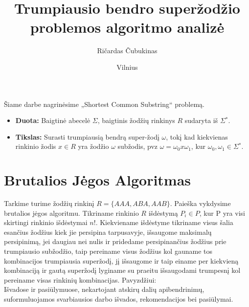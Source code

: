 \documentclass{VUMIFInfKursinis}
\institute{Informatikos institutas}
\title{Trumpiausio bendro superžodžio problemos algoritmo analizė}
\author{Ričardas Čubukinas}
\date{Vilnius \\ \the\year}
\begin{document}
\maketitle

\tableofcontents

Šiame darbe nagrinėsime „Shortest Common Substring“ problemą.
\begin{itemize}
  \item{\textbf{Duota:} Baigtinė abecelė $\Sigma$, baigtinis žodžių rinkinys $R$ sudaryta iš $\Sigma{}^*$.}
  \item{\textbf{Tikslas:} Surasti trumpiausią bendrą super-žodį $\omega$, tokį kad kiekvienas rinkinio žodis $x \in R$ yra žodžio $\omega$ subžodis, pvz $\omega =\omega{}_0x\omega{}_1$, kur $\omega{}_0,\omega{}_1 \in \Sigma{}^*$.}
\end{itemize}
\cite{ausiello1999complexity}

\section{Brutalios Jėgos Algoritmas}
Tarkime turime žodžių rinkinį $R=\{AAA, ABA, AAB\}$. Paieška vykdysime brutalios jėgos algoritmu. Tikriname rinkinio $R$ išdėstymą $P_i \in P$, kur P yra visi skirtingi rinkinio išdėstymai $n!$. Kiekviename išdėstyme tikriname visus šalia esančius žodžius kiek jie persipina tarpusavyje, išsaugome maksimalų persipinimą, jei daugiau nei nulis ir pridedame persipinančius žodžius prie trumpiausio subžodžio, taip pereiname visus žodžius kol gauname tos kombinacijos trumpiausia superžodį, jį išsaugome ir taip einame per kiekvieną kombinaciją ir gautą superžodį lyginame su praeitu išsaugodami trumpesnį kol pereiname visas rinkinių kombinacijas. Pavyzdžiui:\\

Išvadose ir pasiūlymuose, nekartojant atskirų dalių apibendrinimų,
suformuluojamos svarbiausios darbo išvados, rekomendacijos bei pasiūlymai.

\printbibliography[heading=bibintoc] %
\end{document}
